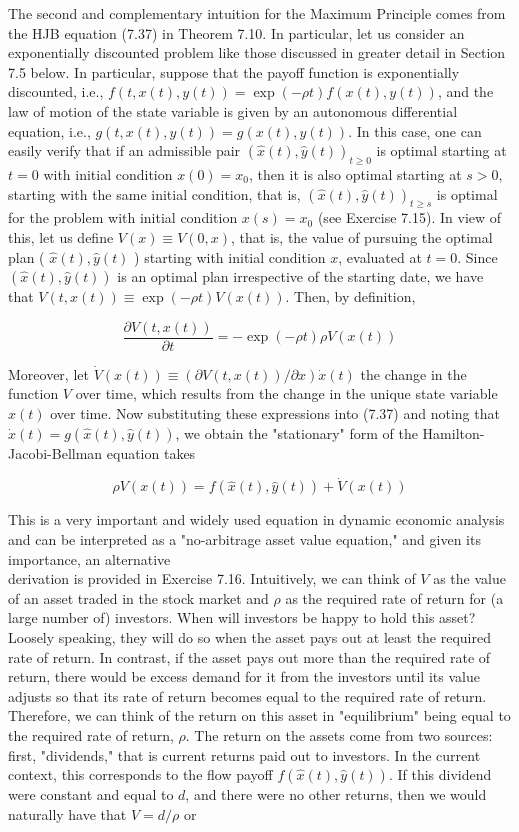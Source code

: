 \documentclass[\topdir/lecture_notes.tex]{subfiles}
\begin{document}
The second and complementary intuition for the Maximum Principle comes from the HJB equation (7.37) in Theorem 7.10. In particular, let us consider an exponentially discounted problem like those discussed in greater detail in Section 7.5 below. In particular, suppose that the payoff function is exponentially discounted, i.e., $f(t, x(t), y(t))= \exp (-\rho t) f(x(t), y(t))$, and the law of motion of the state variable is given by an autonomous differential equation, i.e., $g(t, x(t), y(t))=g(x(t), y(t))$. In this case, one can easily verify that if an admissible pair $(\hat{x}(t), \hat{y}(t))_{t \geq 0}$ is optimal starting at $t=0$ with initial condition $x(0)=x_{0}$, then it is also optimal starting at $s>0$, starting with the same initial condition, that is, $(\hat{x}(t), \hat{y}(t))_{t \geq s}$ is optimal for the problem with initial condition $x(s)=x_{0}$ (see Exercise 7.15). In view of this, let us define $V(x) \equiv V(0, x)$, that is, the value of pursuing the optimal plan ( $\hat{x}(t), \hat{y}(t)$ ) starting with initial condition $x$, evaluated at $t=0$. Since $(\hat{x}(t), \hat{y}(t))$ is an optimal plan irrespective of the starting date, we have that $V(t, x(t)) \equiv \exp (-\rho t) V(x(t))$. Then, by definition,

\[
\frac{\partial V(t, x(t))}{\partial t}=-\exp (-\rho t) \rho V(x(t))
\]

Moreover, let $\dot{V}(x(t)) \equiv(\partial V(t, x(t)) / \partial x) \dot{x}(t)$ the change in the function $V$ over time, which results from the change in the unique state variable $x(t)$ over time. Now substituting these expressions into (7.37) and noting that $\dot{x}(t)=g(\hat{x}(t), \hat{y}(t))$, we obtain the "stationary" form of the Hamilton-Jacobi-Bellman equation takes

\[
\rho V(x(t))=f(\hat{x}(t), \hat{y}(t))+\dot{V}(x(t))
\]

This is a very important and widely used equation in dynamic economic analysis and can be interpreted as a "no-arbitrage asset value equation," and given its importance, an alternative\\
derivation is provided in Exercise 7.16. Intuitively, we can think of $V$ as the value of an asset traded in the stock market and $\rho$ as the required rate of return for (a large number of) investors. When will investors be happy to hold this asset? Loosely speaking, they will do so when the asset pays out at least the required rate of return. In contrast, if the asset pays out more than the required rate of return, there would be excess demand for it from the investors until its value adjusts so that its rate of return becomes equal to the required rate of return. Therefore, we can think of the return on this asset in "equilibrium" being equal to the required rate of return, $\rho$. The return on the assets come from two sources: first, "dividends," that is current returns paid out to investors. In the current context, this corresponds to the flow payoff $f(\hat{x}(t), \hat{y}(t))$. If this dividend were constant and equal to $d$, and there were no other returns, then we would naturally have that $V=d / \rho$ or
\end{document}
